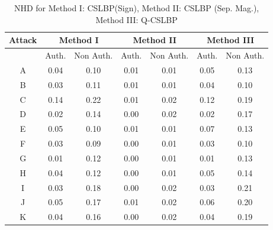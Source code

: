 \documentclass[12pt,a4paper]{jihmsp}
\begin{document}
{{\begin{table}[h]
	\centering
	\caption{NHD for Method I: CSLBP(Sign), Method II: CSLBP (Sep. Mag.),
		Method III: Q-CSLBP}
	
	\begin{tabular}{*7c}
		
		\toprule
		
		Attack
		
		& \multicolumn{2}{c}{Method I} 
		& \multicolumn{2}{c}{Method II}
		& \multicolumn{2}{c}{Method III}
		
		
		\\
		\midrule
		
		{}   &  Auth.  &  Non Auth.  &  Auth.  &  Non Auth.  & Auth.  &  Non Auth.   \\
		
		
		
		A	& 0.04	& 0.10	& 0.01	& 0.01	& 0.05	& 0.13   \\
		
		B	& 0.03	& 0.11	& 0.01	& 0.01	& 0.04	& 0.10   \\
		
		C	& 0.14	& 0.22	& 0.01	& 0.02	& 0.12	& 0.19   \\
		
		D	& 0.02 	& 0.14	& 0.00	& 0.02	& 0.02	& 0.17   \\
		
		E	& 0.05 	& 0.10	& 0.01	& 0.01	& 0.07   & 0.13   \\
		
		F	& 0.03 	& 0.09	& 0.00	& 0.01	& 0.03   & 0.10   \\
		
		G	& 0.01 	& 0.12	& 0.00	& 0.01	& 0.01   & 0.13   \\
		
		H	& 0.04 	& 0.12	& 0.00	& 0.01	& 0.05	& 0.14   \\
		
		I	& 0.03 	& 0.18	& 0.00	& 0.02	& 0.03	& 0.21   \\
		
		J	& 0.05 	& 0.17	& 0.01	& 0.02	& 0.06	& 0.20   \\
		
		K	& 0.04 	& 0.16	& 0.00	& 0.02	& 0.04	& 0.19  \\
		
		\bottomrule
	\end{tabular}
\end{table}

}}
\end{document}
